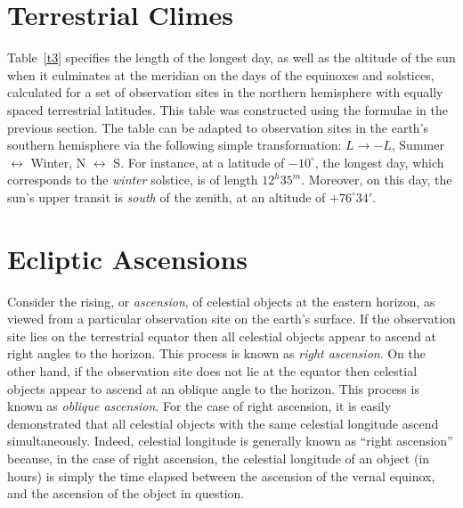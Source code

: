 \section{Terrestrial Climes}
Table~\ref{t3} specifies the length of the longest day, as well as the altitude of the
sun when it culminates at the meridian on the days of the equinoxes and solstices, calculated for a set of observation sites in the northern hemisphere with equally
spaced terrestrial latitudes. This table was constructed
using the formulae in the previous section.  The table can be adapted to observation sites in the earth's
southern hemisphere via the following simple transformation: $L\rightarrow -L$, Summer $\leftrightarrow$ Winter, N $\leftrightarrow$ S. For instance, at a latitude of $-10^\circ$, the longest day, which corresponds
to the {\em winter}\/ solstice, is of length $12^h35^m$. Moreover, on this day, the sun's upper transit
is {\em south}\/ of the zenith, at an altitude of $+76^\circ 34'$. 

\section{Ecliptic Ascensions}
Consider the rising, or {\em ascension}, of celestial objects at the eastern
horizon, as viewed from a particular observation site on the earth's
surface. If the observation site lies on the terrestrial equator then all
celestial objects appear to ascend at right angles to the horizon. This process is
known as {\em right ascension}. On the other hand, if the
observation site does not lie at the equator then celestial objects
appear to ascend at an oblique angle to the horizon. This process is known
as {\em oblique ascension}. For the case of right ascension, it is
easily demonstrated that all celestial objects with the same celestial
longitude ascend simultaneously. Indeed, celestial longitude is generally
known as ``right ascension'' because, in the case of right ascension, the
celestial longitude of an object (in hours) is simply the time elapsed between the ascension of the vernal equinox, and the ascension of the object
in question.

